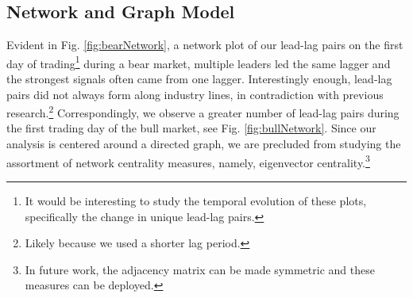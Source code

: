 \documentclass{article}
\begin{document}
\subsection{Network and Graph Model}
Evident in Fig. \ref{fig:bearNetwork}, a network plot of our lead-lag pairs on the first day of trading\footnote{It would be interesting to study the temporal evolution of these plots, specifically the change in unique lead-lag pairs.} during a bear market, multiple leaders led the same lagger and the strongest signals often came from one lagger. Interestingly enough, lead-lag pairs did not always form along industry lines, in contradiction with previous research.\footnote{Likely because we used a shorter lag period.} Correspondingly, we observe a greater number of lead-lag pairs during the first trading day of the bull market, see Fig. \ref{fig:bullNetwork}. Since our analysis is centered around a directed graph, we are precluded from studying the assortment of network centrality measures, namely, eigenvector centrality.\footnote{In future work, the adjacency matrix can be made symmetric and these measures can be deployed.}
\end{document}
